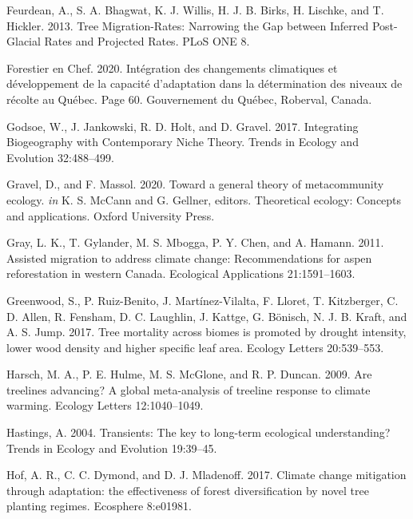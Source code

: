 \documentclass[12pt]{article}
\newlength{\cslhangindent}
\newenvironment{cslreferences}%
  {\setlength{\parindent}{0pt}%
  \everypar{\setlength{\hangindent}{\cslhangindent}}\ignorespaces}%
  {\par}
\begin{document}
\begin{cslreferences}
\leavevmode\hypertarget{ref-Feurdean2013}{}%
Feurdean, A., S. A. Bhagwat, K. J. Willis, H. J. B. Birks, H. Lischke,
and T. Hickler. 2013. Tree Migration-Rates: Narrowing the Gap between
Inferred Post-Glacial Rates and Projected Rates. PLoS ONE 8.

\leavevmode\hypertarget{ref-BureauduForestierenChef2020}{}%
Forestier en Chef. 2020. Intégration des changements climatiques et
développement de la capacité d'adaptation dans la détermination des
niveaux de récolte au Québec. Page 60. Gouvernement du Québec, Roberval,
Canada.

\leavevmode\hypertarget{ref-Godsoe2017}{}%
Godsoe, W., J. Jankowski, R. D. Holt, and D. Gravel. 2017. Integrating
Biogeography with Contemporary Niche Theory. Trends in Ecology and
Evolution 32:488--499.

\leavevmode\hypertarget{ref-Gravel2020}{}%
Gravel, D., and F. Massol. 2020. Toward a general theory of
metacommunity ecology. \emph{in} K. S. McCann and G. Gellner, editors.
Theoretical ecology: Concepts and applications. Oxford University Press.

\leavevmode\hypertarget{ref-Gray2011}{}%
Gray, L. K., T. Gylander, M. S. Mbogga, P. Y. Chen, and A. Hamann. 2011.
Assisted migration to address climate change: Recommendations for aspen
reforestation in western Canada. Ecological Applications 21:1591--1603.

\leavevmode\hypertarget{ref-Greenwood2017}{}%
Greenwood, S., P. Ruiz-Benito, J. Martínez-Vilalta, F. Lloret, T.
Kitzberger, C. D. Allen, R. Fensham, D. C. Laughlin, J. Kattge, G.
Bönisch, N. J. B. Kraft, and A. S. Jump. 2017. Tree mortality across
biomes is promoted by drought intensity, lower wood density and higher
specific leaf area. Ecology Letters 20:539--553.

\leavevmode\hypertarget{ref-Harsch2009}{}%
Harsch, M. A., P. E. Hulme, M. S. McGlone, and R. P. Duncan. 2009. Are
treelines advancing? A global meta-analysis of treeline response to
climate warming. Ecology Letters 12:1040--1049.

\leavevmode\hypertarget{ref-Hastings2004}{}%
Hastings, A. 2004. Transients: The key to long-term ecological
understanding? Trends in Ecology and Evolution 19:39--45.

\leavevmode\hypertarget{ref-Hof2017}{}%
Hof, A. R., C. C. Dymond, and D. J. Mladenoff. 2017. Climate change
mitigation through adaptation: the effectiveness of forest
diversification by novel tree planting regimes. Ecosphere 8:e01981.


\end{cslreferences}
\end{document}
